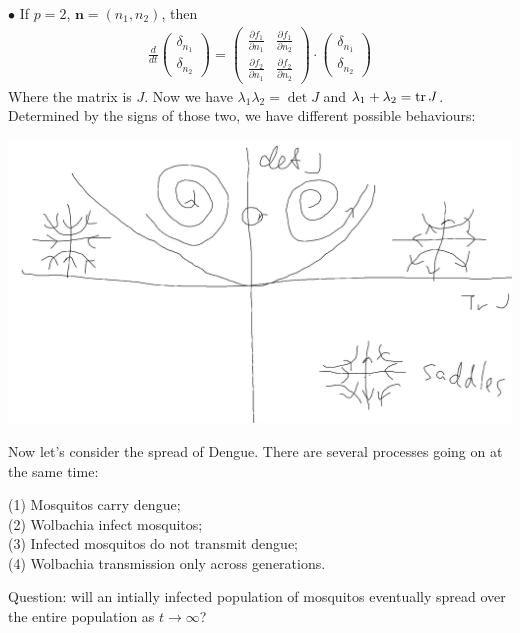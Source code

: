 \documentclass[a4paper]{article}
\begin{document}
$\bullet$ If $p=2$, $\mathbf{n} = (n_1,n_2)$, then 
\begin{equation*}
\begin{aligned}
\frac{d}{dt} \begin{pmatrix} \delta_{n_1} \\
\delta_{n_2}
\end{pmatrix} = \begin{pmatrix}
\frac{\partial f_1}{\partial n_1} & \frac{\partial f_1}{\partial n_2}\\
\frac{\partial f_2}{\partial n_1} & \frac{\partial f_2}{\partial n_2}
\end{pmatrix} \cdot \begin{pmatrix}
\delta_{n_1}\\
\delta_{n_2}
\end{pmatrix}
\end{aligned}
\end{equation*}
Where the matrix is $J$. Now we have $\lambda_1\lambda_2 =\det J$ and $\lambda_1 + \lambda_2 = \operatorname{tr} J$. Determined by the signs of those two, we have different possible behaviours:

\includegraphics[scale=0.5]{image/Bio_01.png}

Now let's consider the spread of Dengue. There are several processes going on at the same time:

(1) Mosquitos carry dengue;\\
(2) Wolbachia infect mosquitos;\\
(3) Infected mosquitos do not transmit dengue;\\
(4) Wolbachia transmission only across generations.

Question: will an intially infected population of mosquitos eventually spread over the entire population as $t \to \infty$?
\end{document}
